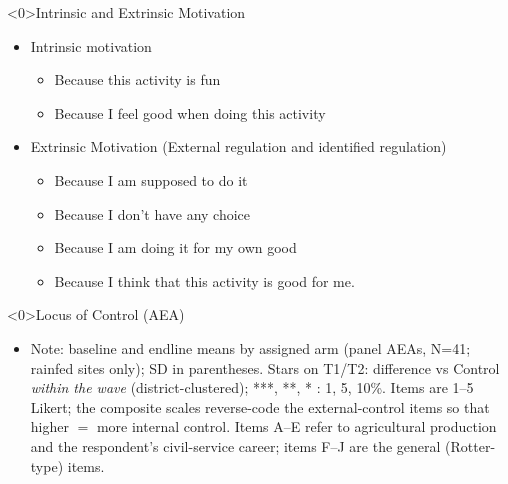 \documentclass[aspectratio=169]{beamer}
\newcommand{\notefont}{\fontsize{5pt}{6pt}\selectfont}
\begin{document}
\begin{frame}<0>{Intrinsic and Extrinsic Motivation}
	\begin{itemize}
		\item Intrinsic motivation
		\begin{itemize}
			\item Because this activity is fun 
			\item Because I feel good when doing this activity
			\vspace{0.3cm}
		\end{itemize}
		\item Extrinsic Motivation (External regulation and identified regulation)
		\begin{itemize}
			\item Because I am supposed to do it
			\item Because I don't have any choice
			\item Because I am doing it for my own good 
			\item Because I think that this activity is good for me. 
		\end{itemize}
		
	\end{itemize}
\end{frame}

\begin{frame}<0>{Locus of Control (AEA)}
	\centering
	\begin{itemize}\notefont
		\item Note: baseline and endline means by assigned arm (panel AEAs, N=41; rainfed sites only); SD in
		parentheses. Stars on T1/T2: difference vs Control \emph{within the wave}
		(district-clustered); ***, **, * : 1, 5, 10\%. Items are 1--5 Likert; the composite
		scales reverse-code the external-control items so that higher $=$ more internal control.
		Items A--E refer to agricultural production and the respondent's civil-service career;
		items F--J are the general (Rotter-type) items.
	\end{itemize}
\end{frame}
\end{document}
